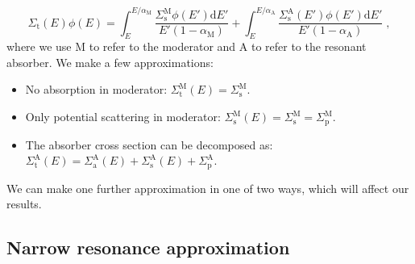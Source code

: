 \begin{equation}\label{eq:slowing_down}
    \Sigma_\mathrm{t}(E)\phi(E) = \int^{E/\alpha_\mathrm{M}}_E \frac{\Sigma^\mathrm{M}_\mathrm{s}\phi(E')\mathrm{d}E'}{E'(1-\alpha_\mathrm{M})} + \int^{E/\alpha_\mathrm{A}}_E \frac{\Sigma^\mathrm{A}_\mathrm{s}(E')\phi(E')\mathrm{d}E'}{E'(1-\alpha_\mathrm{A})}\;\mathrm{,}
\end{equation}
where we use M to refer to the moderator and A to refer to the resonant absorber.
We make a few approximations:
\begin{itemize}
    \item No absorption in moderator: $\Sigma^\mathrm{M}_\mathrm{t}(E) = \Sigma^\mathrm{M}_\mathrm{s}$.
    \item Only potential scattering in moderator: $\Sigma^\mathrm{M}_\mathrm{s}(E) = \Sigma^\mathrm{M}_\mathrm{s} = \Sigma^\mathrm{M}_\mathrm{p}$.
    \item The absorber cross section can be decomposed as: $\Sigma^\mathrm{A}_\mathrm{t}(E) = \Sigma^\mathrm{A}_\mathrm{a}(E) + \Sigma^\mathrm{A}_\mathrm{s}(E) + \Sigma^\mathrm{A}_\mathrm{p}$.
\end{itemize}
We can make one further approximation in one of two ways, which will affect our results.

\subsection{Narrow resonance approximation}

